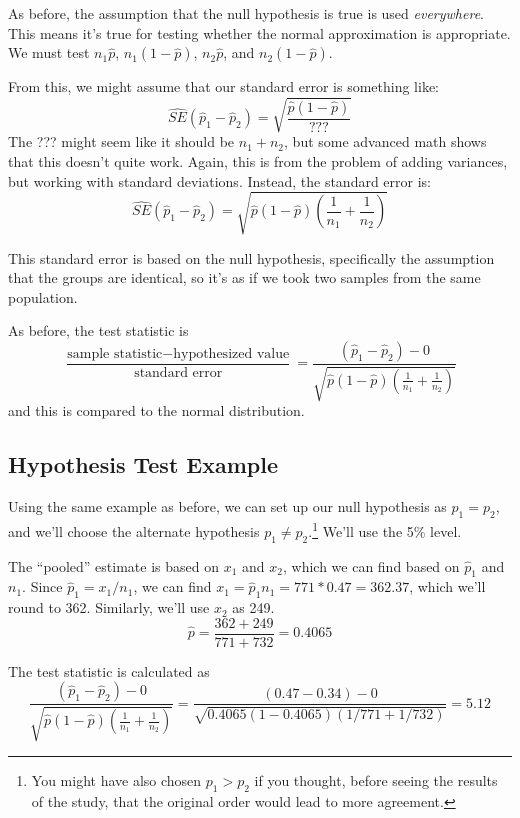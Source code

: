 \documentclass[
  letterpaper,
  DIV=11,
  numbers=noendperiod]{scrreprt}
\begin{document}
As before, the assumption that the null hypothesis is true is used
\emph{everywhere}. This means it's true for testing whether the normal
approximation is appropriate. We must test \(n_1\hat p\),
\(n_1(1 - \hat p)\), \(n_2\hat p\), and \(n_2(1 - \hat p)\).

From this, we might assume that our standard error is something like: \[
\hat{SE}(\hat p_1 - \hat p_2) = \sqrt{\frac{\hat p(1 - \hat p)}{???}}
\] The ??? might seem like it should be \(n_1 + n_2\), but some advanced
math shows that this doesn't quite work. Again, this is from the problem
of adding variances, but working with standard deviations. Instead, the
standard error is: \[
\hat{SE}(\hat p_1 - \hat p_2) = \sqrt{\hat p(1 - \hat p)\left(\frac{1}{n_1} + \frac{1}{n_2}\right)}
\]

This standard error is based on the null hypothesis, specifically the
assumption that the groups are identical, so it's as if we took two
samples from the same population.

As before, the test statistic is \[
\frac{\text{sample statistic} - \text{hypothesized value}}{\text{standard error}} = \frac{(\hat p_1 - \hat p_2) - 0}{\sqrt{\hat p(1 - \hat p)\left(\frac{1}{n_1} + \frac{1}{n_2}\right)}}
\] and this is compared to the normal distribution.

\hypertarget{hypothesis-test-example-1}{%
\subsection{Hypothesis Test Example}\label{hypothesis-test-example-1}}

Using the same example as before, we can set up our null hypothesis as
\(p_1 = p_2\), and we'll choose the alternate hypothesis
\(p_1 \ne p_2\).\footnote{You might have also chosen \(p_1 > p_2\) if
  you thought, before seeing the results of the study, that the original
  order would lead to more agreement.} We'll use the 5\% level.

The ``pooled'' estimate is based on \(x_1\) and \(x_2\), which we can
find based on \(\hat p_1\) and \(n_1\). Since \(\hat p_1 = x_1/n_1\), we
can find \(x_1 = \hat p_1 n_1 = 771 * 0.47 = 362.37\), which we'll round
to 362. Similarly, we'll use \(x_2\) as 249. \[
\hat p = \frac{362 + 249}{771 + 732} = 0.4065
\]

The test statistic is calculated as \[
\frac{(\hat p_1 - \hat p_2) - 0}{\sqrt{\hat p(1 - \hat p)\left(\frac{1}{n_1} + \frac{1}{n_2}\right)}} = \frac{(0.47 - 0.34) - 0}{\sqrt{0.4065(1-0.4065)(1/771 + 1/732)}} = 5.12
\]
\end{document}
